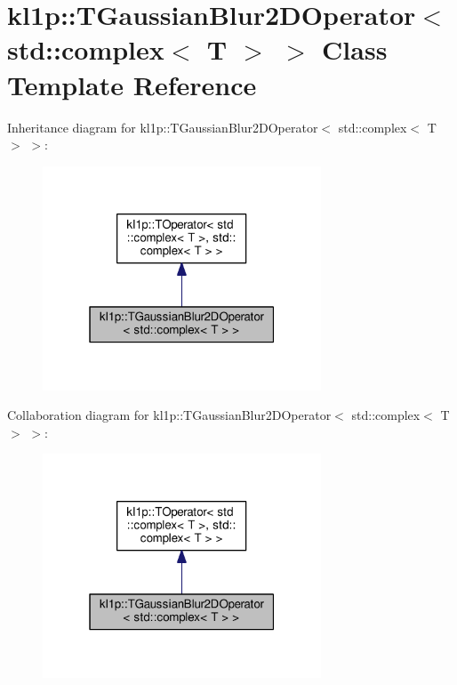 \hypertarget{classkl1p_1_1TGaussianBlur2DOperator_3_01std_1_1complex_3_01T_01_4_01_4}{}\section{kl1p\+:\+:T\+Gaussian\+Blur2\+D\+Operator$<$ std\+:\+:complex$<$ T $>$ $>$ Class Template Reference}
\label{classkl1p_1_1TGaussianBlur2DOperator_3_01std_1_1complex_3_01T_01_4_01_4}


Inheritance diagram for kl1p\+:\+:T\+Gaussian\+Blur2\+D\+Operator$<$ std\+:\+:complex$<$ T $>$ $>$\+:
\nopagebreak
\begin{figure}[H]
\begin{center}
\leavevmode
\includegraphics[width=235pt]{classkl1p_1_1TGaussianBlur2DOperator_3_01std_1_1complex_3_01T_01_4_01_4__inherit__graph}
\end{center}
\end{figure}


Collaboration diagram for kl1p\+:\+:T\+Gaussian\+Blur2\+D\+Operator$<$ std\+:\+:complex$<$ T $>$ $>$\+:
\nopagebreak
\begin{figure}[H]
\begin{center}
\leavevmode
\includegraphics[width=235pt]{classkl1p_1_1TGaussianBlur2DOperator_3_01std_1_1complex_3_01T_01_4_01_4__coll__graph}
\end{center}
\end{figure}
